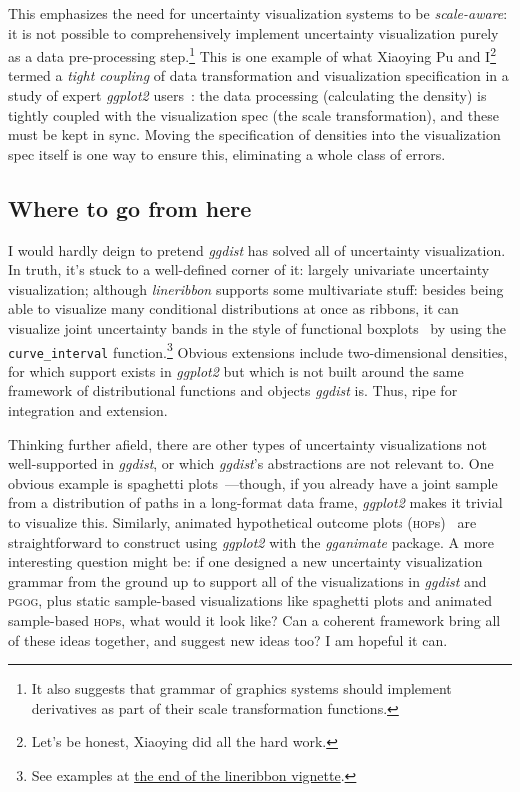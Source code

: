 \documentclass[journal]{vgtc}                     %
\begin{document}
This emphasizes the need for uncertainty visualization systems to be \textit{scale-aware}: it is not possible to comprehensively implement uncertainty visualization purely as a data pre-processing step.\footnote{It also suggests that grammar of graphics systems should implement derivatives as part of their scale transformation functions.} This is one example of what Xiaoying Pu and I\footnote{Let's be honest, Xiaoying did all the hard work.} termed a \textit{tight coupling} of data transformation and visualization specification in a study of expert \textit{ggplot2} users~\cite{pu2023inpractice}: the data processing (calculating the density) is tightly coupled with the visualization spec (the scale transformation), and these must be kept in sync. Moving the specification of densities into the visualization spec itself is one way to ensure this, eliminating a whole class of errors. 


\subsection{Where to go from here}

I would hardly deign to pretend \textit{ggdist} has solved all of uncertainty visualization. In truth, it's stuck to a well-defined corner of it: largely univariate uncertainty visualization; although \textit{lineribbon} supports some multivariate stuff: besides being able to visualize many conditional distributions at once as ribbons, it can visualize joint uncertainty bands in the style of functional boxplots~\cite{sun2011functional,mirzargar2014curve,juul2021fixed} by using the \texttt{curve\_interval} function.\footnote{See examples at \href{https://mjskay.github.io/ggdist/articles/lineribbon.html\#curve-boxplots-aka-lineribbons-with-joint-intervals-or-curvewise-intervals}{the end of the lineribbon vignette}.} Obvious extensions include two-dimensional densities, for which support exists in \textit{ggplot2} but which is not built around the same framework of distributional functions and objects \textit{ggdist} is. Thus, ripe for integration and extension.

Thinking further afield, there are other types of uncertainty visualizations not well-supported in \textit{ggdist}, or which \textit{ggdist}'s abstractions are not relevant to. One obvious example is spaghetti plots~\cite{cox2013visualizing,liu2018visualizing}---though, if you already have a joint sample from a distribution of paths in a long-format data frame, \textit{ggplot2} makes it trivial to visualize this. Similarly, animated hypothetical outcome plots (\textsc{hop}s)~\cite{hullman2015hypothetical,kale2018hypothetical} are straightforward to construct using \textit{ggplot2} with the \textit{gganimate} package. A more interesting question might be: if one designed a new uncertainty visualization grammar from the ground up to support all of the  visualizations in \textit{ggdist} and \textsc{pgog}, plus static sample-based visualizations like spaghetti plots and animated sample-based \textsc{hop}s, what would it look like? Can a coherent framework bring all of these ideas together, and suggest new ideas too? I am hopeful it can.
\end{document}
